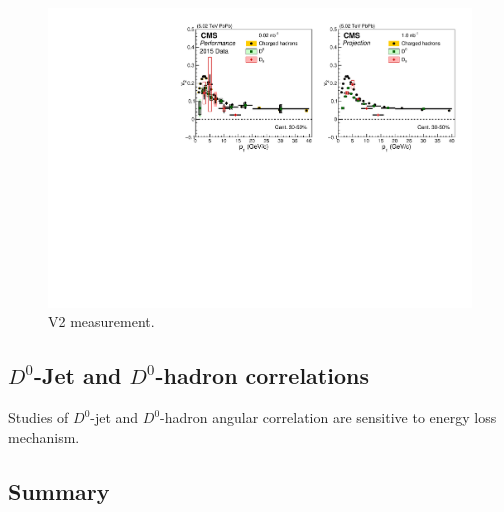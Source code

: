 \begin{figure}[!ht]
\begin{center}
\includegraphics[width=.90\textwidth]{figures/cV2_lumiMB_1.pdf}
\caption{V2 measurement.}
\label{fig:v2_projection}
\end{center}
\end{figure}



\subsection{$D^0$-Jet and $D^0$-hadron correlations}

Studies of $D^0$-jet and $D^0$-hadron angular correlation are sensitive to energy loss mechanism. 


\subsection{Summary}

